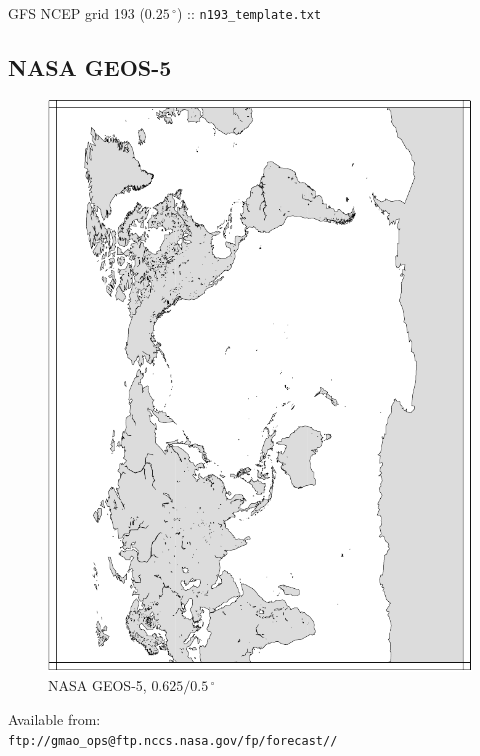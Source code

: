 \documentclass[11pt]{article}   %
\begin{document}
GFS NCEP grid 193 ($0.25 \, ^{\circ}$) :: \verb|n193_template.txt| \\
\tiny  \normalsize

\clearpage
\subsection{NASA GEOS-5}

\begin{figure}[htbp]\begin{center}
 \includegraphics[angle=0,scale=0.95]{Figs/nGCp.pdf}
\parbox{15cm}{\caption{\label{FigGCp}
NASA GEOS-5, $0.625/0.5 \, ^{\circ}$
}}
\end{center}\end{figure}
\clearpage

Available from:\\
\verb|ftp://gmao_ops@ftp.nccs.nasa.gov/fp/forecast//|
\end{document}
